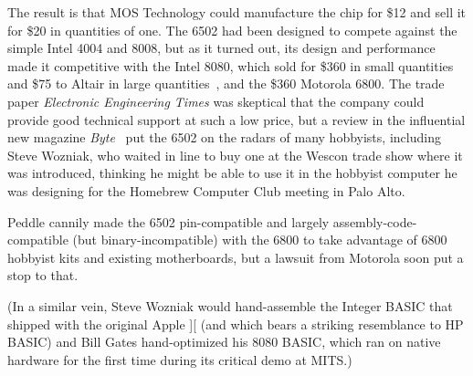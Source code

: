 The result is that MOS Technology could manufacture the chip for \$12
and sell it for \$20 in quantities of one.  The 6502 had been designed
to compete against the simple Intel 4004 and 8008, but as it turned out,
its design and performance made it competitive with the Intel 8080,
which sold for \$360 in small quantities and \$75 to Altair 
in large quantities~\cite[p. 228]{ceruzzi},
and the \$360 Motorola 6800.  The trade paper \emph{Electronic
  Engineering Times} was skeptical that the company could provide good
technical support at such a low price, but a review in the influential
new magazine \emph{Byte}~\cite{byte75:6502} put the 6502 on the radars
of many hobbyists, including Steve Wozniak, who waited in line  to buy
one at the Wescon trade show where it was introduced,
thinking he might be able to use it in the hobbyist computer he was
designing for the Homebrew Computer Club meeting in Palo Alto.  



\begin{geeknote}
Peddle cannily made the 6502 pin-compatible and largely
assembly-code-compatible (but 
binary-incompatible) with the 6800 to take advantage of 
6800 hobbyist kits and existing motherboards, but a lawsuit from
Motorola soon put a stop to that.
\end{geeknote}


(In a similar vein, Steve Wozniak would hand-assemble the Integer BASIC that
shipped with the original Apple ][ (and which bears a striking resemblance to
 HP BASIC) and Bill Gates hand-optimized his 8080 BASIC, which ran on
 native hardware for the first time during its critical demo at MITS.)



